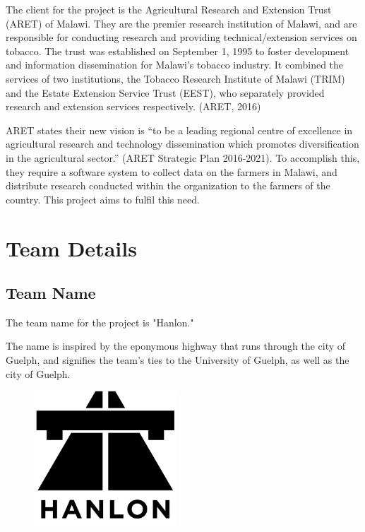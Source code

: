 \documentclass[12pt,letterpaper]{article}
\begin{document}
The client for the project is the Agricultural Research and Extension Trust (ARET) of Malawi. They are the premier research institution of Malawi, and are responsible for conducting research and providing technical/extension services on tobacco. The trust was established on September 1, 1995 to foster development and information dissemination for Malawi's tobacco industry. It combined the services of two institutions, the Tobacco Research Institute of Malawi (TRIM) and the Estate Extension Service Trust (EEST), who separately provided research and extension services respectively. (ARET, 2016)

ARET states their new vision is “to be a leading regional centre of excellence in agricultural research and technology dissemination which promotes diversification in the agricultural sector.” (ARET Strategic Plan 2016-2021). To accomplish this, they require a software system to collect data on the farmers in Malawi, and distribute research conducted within the organization to the farmers of the country. This project aims to fulfil this need.

\clearpage
\section{Team Details}
\subsection{Team Name}
The team name for the project is "Hanlon."\par
The name is inspired by the eponymous highway that runs through the city of Guelph, and signifies the team's ties to the University of Guelph, as well as the city of Guelph.\\

\begin{figure}[H]
	\centering	
	\includegraphics[height=2in]{img/hanlon-logo.png}
	\label{fig:kitten}
\end{figure}
\end{document}
